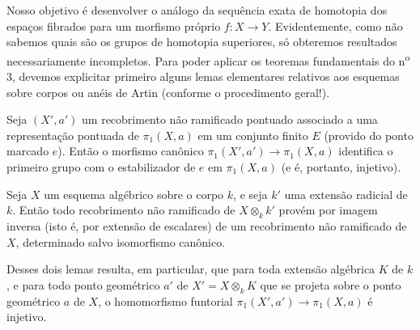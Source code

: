 Nosso objetivo é desenvolver o análogo da sequência exata de homotopia
dos espaços fibrados para um morfismo próprio $f:X\longrightarrow Y$.
Evidentemente, como não sabemos quais são os grupos de homotopia superiores, só
obteremos resultados necessariamente incompletos. Para poder aplicar os
teoremas fundamentais do n\textsuperscript{o} 3, devemos explicitar primeiro
alguns lemas elementares relativos aos esquemas sobre corpos ou anéis de
Artin (conforme o procedimento geral!).

 Seja $(X',a')$ um recobrimento não ramificado pontuado associado
a uma representação pontuada de $\pi_1(X,a)$ em um conjunto finito $E$
(provido do ponto marcado $e$). Então o morfismo canônico
$\pi_1(X',a')\longrightarrow\pi_1(X,a)$ identifica o primeiro grupo com o
estabilizador de $e$ em $\pi_1(X,a)$ (e é, portanto, injetivo).

 Seja $X$ um esquema algébrico sobre o corpo $k$, e seja $k'$
uma extensão radicial de $k$. Então todo recobrimento não ramificado de
$X\otimes_k k'$ provém por imagem inversa (isto é, por extensão de
escalares) de um recobrimento não ramificado de $X$, determinado salvo
isomorfismo canônico.

Desses dois lemas resulta, em particular, que para toda extensão algébrica
$K$ de $k$, e para todo ponto geométrico $a'$ de $X'=X\otimes_k K$ que se
projeta sobre o ponto geométrico $a$ de $X$, o homomorfismo funtorial
$\pi_1(X',a')\longrightarrow\pi_1(X,a)$ é injetivo.

